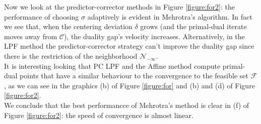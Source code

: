 \documentclass[a4paper,10 pt,titlepage,twoside]{book}
\theoremstyle{plain}
\theoremstyle{definition}
\theoremstyle{remark}
\begin{document}
{{Now we look at the predictor-corrector methods in Figure \ref{figure:for2}: the performance of choosing $\sigma$ adaptively is evident in Mehrotra's algorithm.
In fact we see that, when the centering deviation $\delta$ grows (and the primal-dual iterate moves away from $\mathcal{C}$), the duality gap's velocity increases. Alternatively, in the LPF method the predictor-corrector strategy can't improve the duality gap since there is the restriction of the neighborhood $\mathcal{N}_{-\infty}$.\\
It is interesting looking that PC LPF and the Affine method compute primal-dual points that have a similar behaviour to the convergence to the feasible set $\mathcal{F}$, as we can see in the graphics (b) of Figure \ref{figure:for} and (b) and (d) of Figure \ref{figure:for2}.\\
We conclude that the best performancce of Mehrotra's method is clear in (f) of Figure \ref{figure:for2}: the speed of convergence is almost linear.
\newpage
}}
\end{document}
